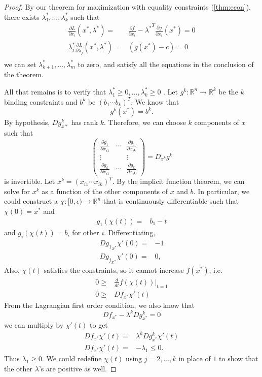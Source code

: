 \documentclass[12pt,reqno]{amsart}
\theoremstyle{definition}
\def\R{\mathbb{R}}
\renewcommand{\to}{{\rightarrow}}
\begin{document}
\begin{proof}
  By our theorem for maximization with equality constraints
  (\ref{thm:econ}), there exists $\lambda_1^*, ..., \lambda_k^*$ such
  that   
  \begin{align*}
    \frac{\partial L}{\partial x_i}(x^*,\lambda^*) = & \frac{\partial
      f}{\partial x_i} - {\lambda^*}^T \frac{\partial g}{\partial
      x_i}(x^*) = 0 \\
    \lambda_j^* \frac{\partial L}{\partial \lambda_j}(x^*,\lambda^*) =
    & \left(g(x^*) - c \right)= 0 \\
  \end{align*}
  we can set $\lambda_{k+1}^*,..., \lambda_m^*$ to zero, and satisfy
  all the equations in the conclusion of the theorem.
  
  All that remains
  is to verify that $\lambda_1^*\geq 0, ..., \lambda_k^* \geq0$ . Let
  $g^k: \R^n \to \R^k$ be the $k$ binding constraints and $b^k$ be
  $(b_1 \cdots b_k)^T$. We know that 
  \[ g^k(x^*) = b^k. \]
  By hypothesis, $Dg^k_{x*}$ has rank $k$. Therefore, we can choose
  $k$ components of $x$ such that
  \[ \begin{pmatrix}    \frac{\partial g_1}{\partial x_{i1}} &  \cdots &\frac{\partial g_1}{\partial x_{ik}}  \\
    \vdots & & \vdots \\
    \frac{\partial g_k}{\partial x_{i1}} &  \cdots &\frac{\partial g_k}{\partial x_{ik}}  
  \end{pmatrix} = D_{x^k}g^k 
  \]
  is invertible. Let $x^k = (x_{i1} \cdots x_{ik})^T $. By the
  implicit function theorem, we can solve for $x^k$ as a function of
  the other components of $x$ and $b$. In particular, we could
  construct a $\chi:[0,\epsilon) \to \R^{n}$ that is continuously
  differentiable such that $\chi(0) = x^*$ and
  \begin{align*}
    g_1(\chi(t)) = & b_1 - t 
  \end{align*}
  and $g_i(\chi(t)) = b_i$ for other $i$. Differentiating,
  \begin{align*}
    {Dg_1}_{x^*} \chi'(0) = & -1  \\
    {Dg_j}_{x^*} \chi'(0) = & 0,
  \end{align*}
  Also, $\chi(t)$ satisfies the constraints, so it cannot increase
  $f(x^*)$, i.e.
  \begin{align*}
    0 \geq & \frac{d}{dt} f(\chi(t)) |_{t=1} \\
    0 \geq & Df_{x^*} \chi'(t)
  \end{align*}
  From the Lagrangian first order condition, we also know that 
  \[ Df_{x^*} - \lambda^k Dg^k_{x^*} = 0 \]
  we can multiply by $\chi'(t)$ to get
  \begin{align*} 
    Df_{x^*}\chi'(t) = & \lambda^k Dg^k_{x^*} \chi'(t) \\
    Df_{x^*} \chi'(t) = & -\lambda_1  \leq 0.
  \end{align*}
  Thus $\lambda_1 \geq 0$. We could redefine $\chi(t)$ using $j=2,
  ..., k$ in place of $1$ to show that the other $\lambda$'s are
  positive as well.  
\end{proof}
\end{document}
